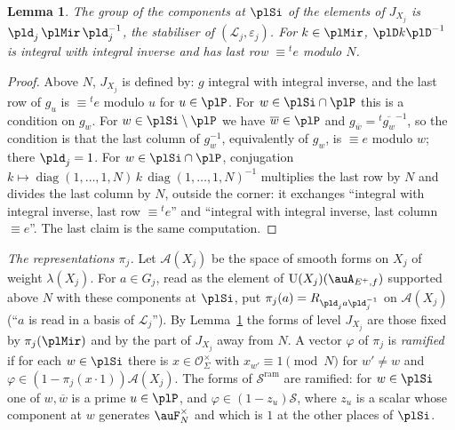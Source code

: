 \documentclass[10pt]{amsart}
\newtheorem{lemma}[theorem]{Lemma}
\theoremstyle{definition}
\theoremstyle{remark}
\providecommand{\auO}{\mathcal O}
\providecommand{\auS}{\mathcal S}
\providecommand{\auSram}{\mathcal S^{\mathrm{ram}}}
\providecommand{\auU}{\mathrm U}
\providecommand{\aubar}[1]{\overline{#1}}
\begin{document}
\begin{lemma}\label{pl:mir}
The group of the components at $\plSi$ of the elements of $J_{X_j}$ is $\pld_j\,\plMir\,
\pld_j^{-1}$, the stabiliser of $(\mathcal L_j,\varepsilon_j)$. For $k\in\plMir$, $\plD k\plD^{-1}$ is
integral with integral inverse and has last row $\equiv{}^te$ modulo $N$.
\end{lemma}
\begin{proof}
Above $N$, $J_{X_j}$ is defined by: $g$ integral with integral inverse, and the last row of $g_u$
is $\equiv{}^te$ modulo $u$ for $u\in\plP$. For $w\in\plSi\cap\plP$ this is a condition on $g_w$.
For $w\in\plSi\setminus\plP$ we have $\aubar w\in\plP$ and $g_{\aubar w}={}^t\aubar{g_w}^{-1}$, so
the condition is that the last column of $g_w^{-1}$, equivalently of $g_w$, is $\equiv e$ modulo
$w$; there $\pld_j=1$. For $w\in\plSi\cap\plP$, conjugation
$k\mapsto\operatorname{diag}(1,\dots,1,N)\,k\,\operatorname{diag}(1,\dots,1,N)^{-1}$
multiplies the last row by $N$ and divides the last column by $N$, outside the corner: it
exchanges ``integral with integral inverse, last row $\equiv{}^te$'' and ``integral with integral
inverse, last column $\equiv e$''. The last claim is the same computation.
\end{proof}

\emph{The representations $\pi_j$.} Let $\mathcal A(X_j)$ be the space of smooth forms on $X_j$ of
weight $\lambda(X_j)$. For $a\in G_j$, read as the element of $\auU(X_j)(\auA_{E^+,f})$ supported
above $N$ with these components at $\plSi$, put $\pi_j(a)=R_{\pld_ja\pld_j^{-1}}$ on $\mathcal
A(X_j)$ (``$a$ is read in a basis of $\mathcal L_j$''). By Lemma~\ref{pl:mir} the forms of level $J_{X_j}$
are those fixed by $\pi_j(\plMir)$ and by the part of $J_{X_j}$ away from $N$. A vector $\varphi$
of $\pi_j$ is \emph{ramified} if for each $w\in\plSi$ there is $x\in\auO_\Sigma^\times$ with
$x_{w'}\equiv1\pmod N$ for $w'\ne w$ and $\varphi\in(1-\pi_j(x\cdot1))\mathcal A(X_j)$. The forms
of $\auSram$ are ramified: for $w\in\plSi$ one of $w,\aubar w$ is a prime $u\in\plP$, and
$\varphi\in(1-z_u)\auS$, where $z_u$ is a scalar whose component at $w$ generates $\auF_N^\times$
and which is $1$ at the other places of $\plSi$.
\end{document}
